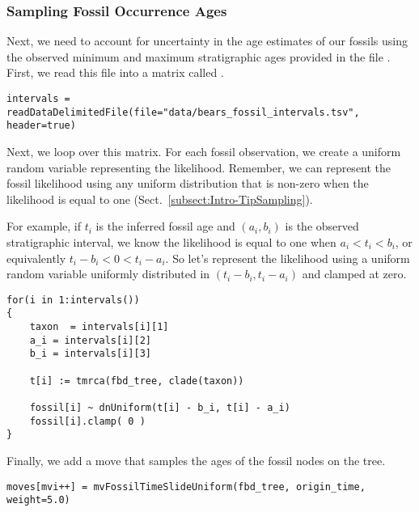 \subsubsection{Sampling Fossil Occurrence Ages}\label{subsub:Exercise-FBD-TipSampling}

Next, we need to account for uncertainty in the age estimates of our fossils using the observed minimum and maximum stratigraphic ages provided in the file .
First, we read this file into a matrix called .

{\tt \begin{snugshade*}
\begin{lstlisting}
intervals = readDataDelimitedFile(file="data/bears_fossil_intervals.tsv", header=true)
\end{lstlisting}
\end{snugshade*}}

Next, we loop over this matrix.
For each fossil observation, we create a uniform random variable representing the likelihood.
Remember, we can represent the fossil likelihood using any uniform distribution that is non-zero when the likelihood is equal to one (Sect.\ \ref{subsect:Intro-TipSampling}).

For example, if $t_i$ is the inferred fossil age and $(a_i,b_i)$ is the observed stratigraphic interval, we know the likelihood is equal to one when $a_i < t_i < b_i$, or equivalently $t_i - b_i < 0 < t_i - a_i$.
So let's represent the likelihood using a uniform random variable uniformly distributed in $(t_i - b_i, t_i - a_i)$ and clamped at zero.


{\tt \begin{snugshade*}
\begin{lstlisting}
for(i in 1:intervals())
{
    taxon  = intervals[i][1]
    a_i = intervals[i][2]
    b_i = intervals[i][3]
    
    t[i] := tmrca(fbd_tree, clade(taxon))
        
    fossil[i] ~ dnUniform(t[i] - b_i, t[i] - a_i)
    fossil[i].clamp( 0 )
}
\end{lstlisting}
\end{snugshade*}}


Finally, we add a move that samples the ages of the fossil nodes on the tree. 
{\tt \begin{snugshade*}
\begin{lstlisting}
moves[mvi++] = mvFossilTimeSlideUniform(fbd_tree, origin_time, weight=5.0)
\end{lstlisting}
\end{snugshade*}}

